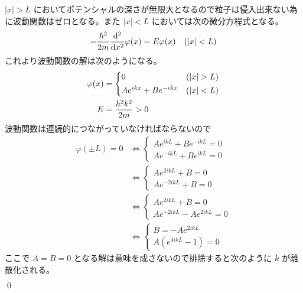 \documentclass[uplatex,dvipdfmx,a4paper,11pt]{jlreq}
\makeatletter
\numberwithin{equation}{section}
\theoremstyle{definition}
\renewenvironment{proof}[1][\proofname]{\par
  \normalfont
  \topsep6\p@\@plus6\p@ \trivlist
  \item[\hskip\labelsep{\bfseries #1}\@addpunct{\bfseries}]\ignorespaces\quad\par
}{%
  \qed\endtrivlist\@endpefalse
}
\renewcommand\proofname{証明}
\makeatother
\begin{document}
\begin{proof}
  $|x| > L$ においてポテンシャルの深さが無限大となるので粒子は侵入出来ない為に波動関数はゼロとなる。また $|x| < L$ においては次の微分方程式となる。
  \begin{align}
    -\frac{\hbar^2}{2m}\dv[2]{x}\varphi(x) & = E\varphi(x) & (|x| < L)
  \end{align}
  これより波動関数の解は次のようになる。
  \begin{align}
    \varphi(x) & = \begin{dcases}
                     0                    & (|x| > L) \\
                     Ae^{ikx} + Be^{-ikx} & (|x| < L)
                   \end{dcases} \\
    E          & = \frac{\hbar^2k^2}{2m} > 0
  \end{align}
  波動関数は連続的につながっていなければならないので
  \begin{align}
    \varphi(\pm L) = 0 & \iff \begin{cases}
                                Ae^{ikL} + Be^{-ikL} = 0 \\
                                Ae^{-ikL} + Be^{ikL} = 0
                              \end{cases}  \\
                       & \iff \begin{cases}
                                Ae^{2ikL} + B = 0 \\
                                Ae^{-2ikL} + B = 0
                              \end{cases}         \\
                       & \iff \begin{cases}
                                Ae^{2ikL} + B = 0 \\
                                Ae^{-2ikL} - Ae^{2ikL} = 0
                              \end{cases} \\
                       & \iff \begin{cases}
                                B = -Ae^{2ikL} \\
                                A(e^{4ikL} - 1) = 0
                              \end{cases}
  \end{align}
  ここで $A = B = 0$ となる解は意味を成さないので排除すると次のように $k$ が離散化される。
  \begin{align}

\end{align}
\end{proof}
\end{document}
